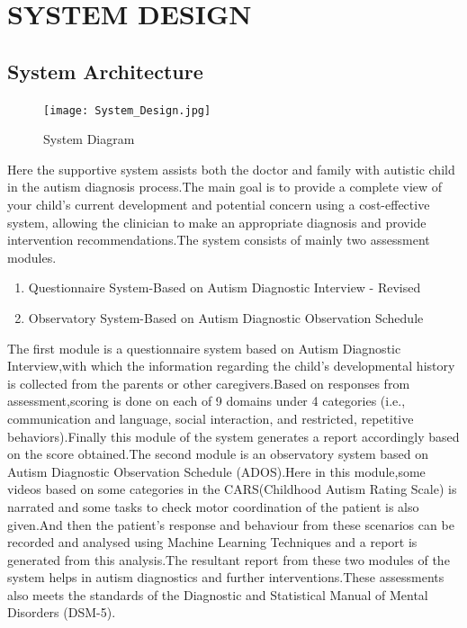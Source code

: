 \chapter{SYSTEM DESIGN}  %


 
\section{System Architecture}

\begin{figure}[h]
\label{ss}
\centering
\texttt{[image: System\_Design.jpg]}
\caption{System Diagram}
\end{figure}
Here the supportive system assists both the doctor and family with autistic child in the autism diagnosis process.The main goal is to provide a complete view of your child’s current development and potential concern using a cost-effective system, allowing the clinician to make an appropriate diagnosis and provide intervention recommendations.The system consists of mainly two assessment modules.
\begin{enumerate}
    \item Questionnaire System-Based on Autism Diagnostic Interview - Revised
    \item Observatory System-Based on Autism Diagnostic Observation Schedule
    \end{enumerate}
The first module is a questionnaire system based on Autism Diagnostic Interview,with which the information regarding the child’s developmental history is collected from the parents or other caregivers.Based on responses from assessment,scoring is done on each of 9 domains under 4 categories (i.e., communication and language, social interaction, and restricted, repetitive behaviors).Finally this module of the system generates a report accordingly based on the score obtained.The second module is an observatory system based on Autism Diagnostic Observation Schedule (ADOS).Here in this module,some videos based on some categories in the CARS(Childhood Autism Rating Scale) is narrated and some tasks to check motor coordination of the patient is also given.And then the patient’s response and behaviour from these scenarios can be recorded and analysed using Machine Learning Techniques and a report is generated from this analysis.The resultant report from these two modules of the system helps in autism diagnostics and further interventions.These assessments also meets the standards of the Diagnostic and Statistical Manual of Mental Disorders (DSM-5).
